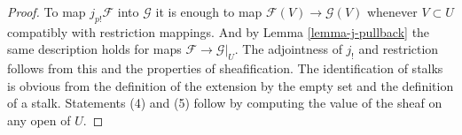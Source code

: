 \documentclass{stacks-project}
\theoremstyle{plain}
\theoremstyle{definition}
\theoremstyle{remark}
\numberwithin{equation}{subsection}
\begin{document}
\begin{proof}
To map $j_{p!}\mathcal{F}$ into $\mathcal{G}$
it is enough to map $\mathcal{F}(V) \to \mathcal{G}(V)$
whenever $V \subset U$ compatibly with restriction
mappings. And by Lemma \ref{lemma-j-pullback}
the same description holds for maps
$\mathcal{F} \to \mathcal{G}|_U$.
The adjointness of $j_!$ and restriction follows
from this and the properties of sheafification.
The identification of stalks is obvious from the
definition of the extension by the empty set
and the definition of a stalk.
Statements (4) and (5) follow by computing the
value of the sheaf on any open of $U$.
\end{proof}
\end{document}
